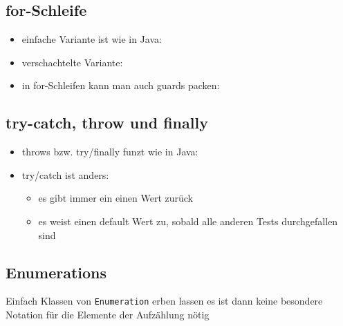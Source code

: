 \subsection{for-Schleife}
\begin{itemize}
  \item einfache Variante ist wie in Java:
  
  
  
  \item verschachtelte Variante:
  
  
  
  \item in for-Schleifen kann man auch guards packen:
  
  
\end{itemize}


\subsection{try-catch, throw und finally}
\begin{itemize}
  \item throws bzw. try/finally funzt wie in Java:
  
  
  
  \item try/catch ist anders:
  \begin{itemize}
    \item es gibt immer ein einen Wert zurück
    \item es weist einen default Wert zu, sobald alle anderen Tests
    durchgefallen sind
    
        
  \end{itemize}
\end{itemize}


\subsection{Enumerations}
Einfach Klassen von \texttt{Enumeration} erben lassen \und es ist dann
keine besondere Notation für die Elemente der Aufzählung nötig




